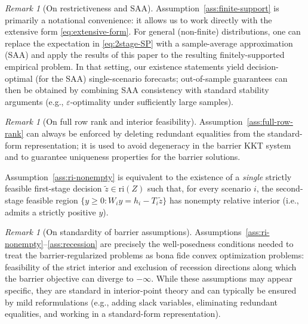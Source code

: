\documentclass[11pt]{article}
\theoremstyle{plain}
\theoremstyle{definition}
\theoremstyle{remark}
\newtheorem{remark}[theorem]{Remark}
\newcommand{\ri}{\mathrm{ri}}
\begin{document}
\begin{remark}[On restrictiveness and SAA]\label{rem:saa}
Assumption~\ref{ass:finite-support} is primarily a notational convenience: it allows us to work directly with
the extensive form \eqref{eq:extensive-form}.  For general (non-finite) distributions, one can replace the
expectation in \eqref{eq:2stage-SP} with a sample-average approximation (SAA) and apply the results of this
paper to the resulting finitely-supported empirical problem.  In that setting, our existence statements yield
decision-optimal (for the SAA) single-scenario forecasts; out-of-sample guarantees can then be obtained by
combining SAA consistency with standard stability arguments (e.g., $\varepsilon$-optimality under sufficiently
large samples).
\end{remark}

\begin{remark}[On full row rank and interior feasibility]\label{rem:rank-ri}
Assumption~\ref{ass:full-row-rank} can always be enforced by deleting redundant equalities from the
standard-form representation; it is used to avoid degeneracy in the barrier KKT system and to guarantee
uniqueness properties for the barrier solutions.

Assumption~\ref{ass:ri-nonempty} is equivalent to the existence of a \emph{single} strictly feasible first-stage
decision $\tilde z\in\ri(Z)$ such that, for every scenario $i$, the second-stage feasible region
$\{y\ge 0: W_i y = h_i - T_i\tilde z\}$ has nonempty relative interior (i.e., admits a strictly positive $y$).
\end{remark}

\begin{remark}[On standardity of barrier assumptions]\label{rem:barrier-standard}
Assumptions~\ref{ass:ri-nonempty}--\ref{ass:recession} are precisely the well-posedness conditions needed to
treat the barrier-regularized problems as bona fide convex optimization problems: feasibility of the strict
interior and exclusion of recession directions along which the barrier objective can diverge to $-\infty$.
While these assumptions may appear specific, they are standard in interior-point theory and can typically be
ensured by mild reformulations (e.g., adding slack variables, eliminating redundant equalities, and working in
a standard-form representation).
\end{remark}

\end{document}
